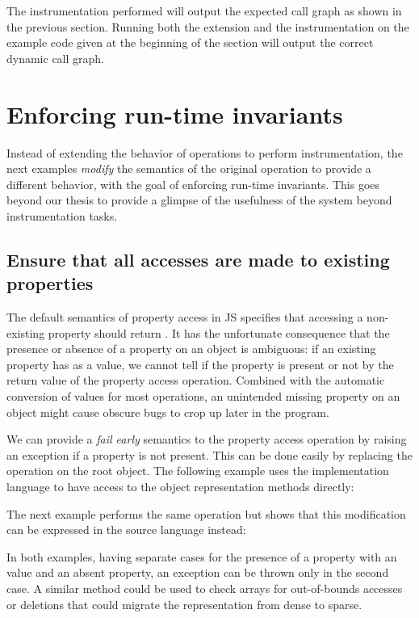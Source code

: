 
The instrumentation performed will output the expected call graph as shown in
the previous section. Running both the extension and the instrumentation on the
example code given at the beginning of the section will output the correct
dynamic call graph.

\section{Enforcing run-time invariants}

Instead of extending the behavior of operations to perform instrumentation, the
next examples \textit{modify} the semantics of the original operation to provide
a different behavior, with the goal of enforcing run-time invariants. This goes
beyond our thesis to provide a glimpse of the usefulness of the system beyond
instrumentation tasks.

\subsection{Ensure that all accesses are made to existing properties}

The default semantics of property access in JS specifies that accessing
a non-existing property should return . It has the unfortunate
consequence that the presence or absence of a property on an object is
ambiguous: if an existing property has  as a value, we cannot
tell if the property is present or not by the return value of the property
access operation. Combined with the automatic conversion of values for most
operations, an unintended missing property on an object might cause obscure
bugs to crop up later in the program.

We can provide a \textit{fail early} semantics to the property access operation
by raising an exception if a property is not present. This can be done easily
by replacing the  operation on the root object. The following
example uses the implementation language to have access to the object
representation methods directly:


The next example performs the same operation but shows that this modification 
can be expressed in the source language instead:


In both examples, having separate cases for the presence of a property with an
 value and an absent property, an exception can be thrown only in
the second case. A similar method could be used to check arrays for
out-of-bounds accesses or deletions that could migrate the representation from
dense to sparse.

